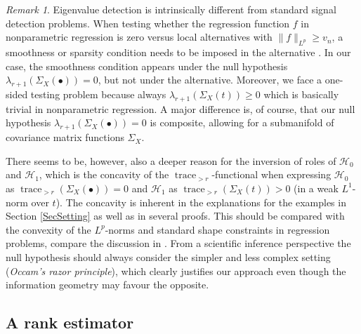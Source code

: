 \documentclass[preprint,aos]{imsart}
\numberwithin{equation}{section}
\theoremstyle{remark}
\newtheorem{remark}[satz]{Remark}
\DeclareMathOperator{\trace}{trace}
\renewcommand{\cdot}{{\scriptstyle \bullet} }
\providecommand{\norm}[1]{\lVert #1 \rVert}
\renewcommand{\ge}{\geqslant}
\begin{document}
\begin{remark}
Eigenvalue detection is intrinsically different from standard signal detection problems. When testing whether the regression function $f$ in nonparametric regression is zero versus local alternatives with $\norm{f}_{L^p}\ge v_n$, a smoothness or sparsity condition needs to be imposed in the alternative \citep{ingster2012}. In our case, the smoothness condition appears under the null hypothesis $\lambda_{r+1}(\Sigma_X(\cdot))=0$, but not under the alternative. Moreover, we face a one-sided testing problem because always $\lambda_{r+1}(\Sigma_X(t))\ge 0$ which is basically trivial in nonparametric regression. A major difference is, of course, that our null hypothesis $\lambda_{r+1}(\Sigma_X(\cdot))=0$ is composite, allowing for a submanifold of covariance matrix functions $\Sigma_X$.

There seems to be, however, also a deeper reason for the inversion of roles of ${\mathcal H}_0$ and ${\mathcal H}_1$, which is the concavity of the $\trace_{>r}$-functional when expressing ${\mathcal H}_0$ as $\trace_{>r}(\Sigma_X(\cdot))=0$ and ${\mathcal H}_1$ as $\trace_{>r}(\Sigma_X(t))>0$ (in a weak $L^1$-norm over $t$). The concavity is inherent in the explanations for the examples in Section \ref{SecSetting} as well as in several proofs. This should be
compared with the convexity of the $L^p$-norms and standard shape constraints in regression problems, compare  the discussion in \citet{juditsky2002}. From a scientific inference perspective the null hypothesis should always consider the simpler and less complex setting ({\it Occam's razor principle}), which clearly justifies our approach even though the information geometry may favour the opposite.
\end{remark}

\subsection{\bf A rank estimator}
\end{document}

